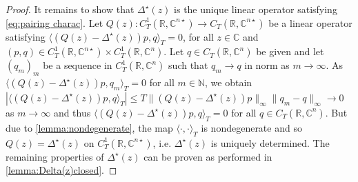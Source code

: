 \documentclass[10pt,a4paper]{amsart}
\begin{document}
\begin{proof}
It remains to show that $\Delta^{\star}(z)$ is the unique linear operator satisfying \eqref{eq:pairing charac}. Let $Q(z) : C_T^1(\mathbb{R},\mathbb{C}^{n \star}) \to C_T(\mathbb{R},\mathbb{C}^{n \star})$ be a linear operator satisfying $\langle (Q(z) - \Delta^\star(z))p,q \rangle_T = 0$, for all $z \in \mathbb{C}$ and $ (p,q) \in C_T^1(\mathbb{R},\mathbb{C}^{n \star}) \times  C_T^1(\mathbb{R},\mathbb{C}^n)$. Let $q \in C_T(\mathbb{R},\mathbb{C}^n)$ be given and let $(q_m)_m$ be a sequence in $C_T^1(\mathbb{R},\mathbb{C}^n)$ such that $q_m \to q$ in norm as $m \to \infty$. As $\langle (Q(z) - \Delta^\star(z))p,q_m \rangle_T = 0$ for all $m \in \mathbb{N}$, we obtain $|\langle (Q(z) - \Delta^\star(z))p,q \rangle_T| \leq T \| (Q(z) - \Delta^\star(z))p \|_\infty \| q_m - q \|_\infty \to 0$ as $m \to \infty$ and thus $\langle (Q(z) - \Delta^\star(z))p,q \rangle_T = 0$ for all $q \in C_T(\mathbb{R},\mathbb{C}^n)$. But due to \cref{lemma:nondegenerate}, the map $\langle \cdot , \cdot \rangle_T$ is nondegenerate and so $Q(z) = \Delta^\star(z)$ on $C_T^1(\mathbb{R},\mathbb{C}^{n \star})$, i.e. $\Delta^\star(z)$ is uniquely determined. The remaining properties of $\Delta^\star(z)$ can be proven as performed in \cref{lemma:Delta(z)closed}.
\end{proof}
\end{document}
